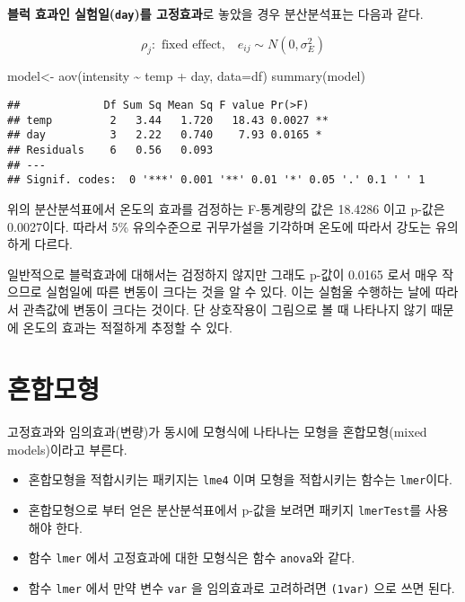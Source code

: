 \documentclass[
]{book}
\newenvironment{Shaded}{\begin{snugshade}}{\end{snugshade}}
\newcommand{\AttributeTok}[1]{\textcolor[rgb]{0.77,0.63,0.00}{#1}}
\newcommand{\FunctionTok}[1]{\textcolor[rgb]{0.00,0.00,0.00}{#1}}
\newcommand{\NormalTok}[1]{#1}
\newcommand{\OtherTok}[1]{\textcolor[rgb]{0.56,0.35,0.01}{#1}}
\newcommand{\SpecialCharTok}[1]{\textcolor[rgb]{0.00,0.00,0.00}{#1}}
\begin{document}
\textbf{블럭 효과인 실험일(\texttt{day})를 고정효과}로 놓았을 경우 분산분석표는 다음과 같다.

\[ \rho_j : \text{ fixed effect,}  \quad e_{ij} \sim N(0, \sigma_E^2) \]

\begin{Shaded}
\begin{Highlighting}[]
\NormalTok{model}\OtherTok{\textless{}{-}} \FunctionTok{aov}\NormalTok{(intensity }\SpecialCharTok{\textasciitilde{}}\NormalTok{ temp }\SpecialCharTok{+}\NormalTok{ day, }\AttributeTok{data=}\NormalTok{df)}
\FunctionTok{summary}\NormalTok{(model)}
\end{Highlighting}
\end{Shaded}

\begin{verbatim}
##             Df Sum Sq Mean Sq F value Pr(>F)   
## temp         2   3.44   1.720   18.43 0.0027 **
## day          3   2.22   0.740    7.93 0.0165 * 
## Residuals    6   0.56   0.093                  
## ---
## Signif. codes:  0 '***' 0.001 '**' 0.01 '*' 0.05 '.' 0.1 ' ' 1
\end{verbatim}

위의 분산분석표에서 온도의 효과를 검정하는 F-통계량의 값은 18.4286 이고 p-값은 0.0027이다. 따라서 5\% 유의수준으로 귀무가설을 기각하며 온도에 따라서 강도는 유의하게 다르다.

일반적으로 블럭효과에 대해서는 검정하지 않지만 그래도 p-값이 0.0165 로서 매우 작으므로 실험일에 따른 변동이 크다는 것을 알 수 있다. 이는 실험울 수행하는 날에 따라서 관측값에 변동이 크다는 것이다. 단 상호작용이 그림으로 볼 때 나타나지 않기 때문에 온도의 효과는 적절하게 추정할 수 있다.

\hypertarget{uxd63cuxd569uxbaa8uxd615}{%
\section{혼합모형}\label{uxd63cuxd569uxbaa8uxd615}}

고정효과와 임의효과(변량)가 동시에 모형식에 나타나는 모형을 혼합모형(mixed models)이라고 부른다.

\begin{itemize}
\item
  혼합모형을 적합시키는 패키지는 \texttt{lme4} 이며 모형을 적합시키는 함수는 \texttt{lmer}이다.
\item
  혼합모형으로 부터 얻은 분산분석표에서 p-값을 보려면 패키지 \texttt{lmerTest}를 사용해야 한다.
\item
  함수 \texttt{lmer} 에서 고정효과에 대한 모형식은 함수 \texttt{anova}와 같다.
\item
  함수 \texttt{lmer} 에서 만약 변수 \texttt{var} 을 임의효과로 고려하려면 \texttt{(1\textbar{}var)} 으로 쓰면 된다.
\end{itemize}
\end{document}
